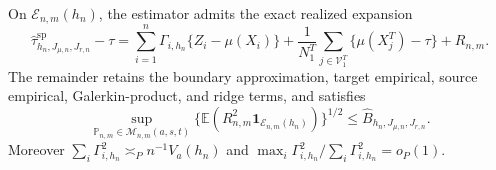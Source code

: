 On \(\mathcal E_{n,m}(h_n)\), the estimator admits the exact realized expansion
\[
 \widehat\tau^{\mathrm{sp}}_{h_n,J_{\mu,n},J_{r,n}}-\tau
 =\sum_{i=1}^n\Gamma_{i,h_n}\{Z_i-\mu(X_i)\}
 +\frac1{N^T_1}\sum_{j\in\mathcal V^T_1}\{\mu(X_j^T)-\tau\}+R_{n,m}.
\]
The remainder retains the boundary approximation, target empirical, source empirical, Galerkin-product, and ridge terms, and satisfies
\[
 \sup_{\mathbb P_{n,m}\in\mathcal M_{n,m}(a,s,t)}
 \{\mathbb E(R_{n,m}^2\mathbf1_{\mathcal E_{n,m}(h_n)})\}^{1/2}
 \le\widehat B_{h_n,J_{\mu,n},J_{r,n}}.
\]
Moreover \(\sum_i\Gamma_{i,h_n}^2\asymp_Pn^{-1}V_a(h_n)\) and \(\max_i\Gamma_{i,h_n}^2/\sum_i\Gamma_{i,h_n}^2=o_P(1)\).